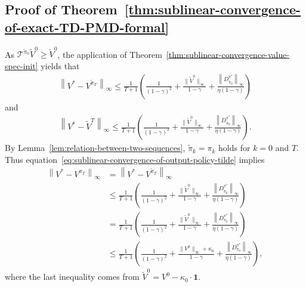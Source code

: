 \documentclass[10pt]{article}
\newcommand{\calT}{\mathcal{T}}
\newcommand{\ls}{\left}
\newcommand{\rs}{\right}
\theoremstyle{plain}
\theoremstyle{definition}
\begin{document}
\subsection{Proof of Theorem~\ref{thm:sublinear-convergence-of-exact-TD-PMD-formal}}
\label{sec:pf:thm:sublinear-convergence-of-exact-TD-PMD-formal}
As $\calT^{\tilde{\pi}_0} \tilde{V}^0 \geq \tilde{V}^0$, the application of Theorem~\ref{thm:sublinear-convergence-value-spec-init} yields that
\begin{align}
    \ls\| V^* - V^{\tilde{\pi}_T} \rs\|_\infty \leq \frac{1}{T+1} \ls( \frac{1}{(1-\gamma)^2} \!+\! \frac{\| \tilde{V}^0 \|_\infty}{1-\gamma} \!+\! \frac{\ls\| D^{\pi^*}_{\tilde{\pi}_0} \rs\|_\infty}{\eta(1-\gamma)} \rs)
    \label{eq:sublinear-convergence-of-output-policy-tilde}
\end{align}
and 
\begin{align}
    \ls\| V^* - \tilde{V}^T \rs\|_\infty \leq \frac{1}{T+1} \ls( \frac{1}{(1-\gamma)^2} \!+\! \frac{\| \tilde{V}^0 \|_\infty}{1-\gamma} \!+\! \frac{\ls\| D^{\pi^*}_{\tilde{\pi}_0} \rs\|_\infty}{\eta(1-\gamma)} \rs).
    \label{eq:sublinear-convergence-of-output-value-tilde}
\end{align}
By Lemma~\ref{lem:relation-between-two-sequences}, $\tilde{\pi}_k = \pi_k$ holds for $k=0$ and $T$. Thus equation~\eqref{eq:sublinear-convergence-of-output-policy-tilde} implies
\begin{align*}
    \ls\| V^* - V^{\pi_T} \rs\|_\infty &=  \ls\| V^* - V^{\tilde{\pi}_T} \rs\|_\infty \\
    &\leq \frac{1}{T+1} \ls( \frac{1}{(1-\gamma)^2} \!+\! \frac{\| \tilde{V}^0 \|_\infty}{1-\gamma} \!+\! \frac{\ls\| D^{\pi^*}_{\tilde{\pi}_0} \rs\|_\infty}{\eta(1-\gamma)} \rs) \\
    &= \frac{1}{T+1} \ls( \frac{1}{(1-\gamma)^2} \!+\! \frac{\| \tilde{V}^0 \|_\infty}{1-\gamma} \!+\! \frac{\ls\| D^{\pi^*}_{{\pi}_0} \rs\|_\infty}{\eta(1-\gamma)} \rs) \\
    &\leq \frac{1}{T+1} \ls( \frac{1}{(1-\gamma)^2} \!+\! \frac{\| {V}^0 \|_\infty + \kappa_0}{1-\gamma} \!+\! \frac{\ls\| D^{\pi^*}_{{\pi}_0} \rs\|_\infty}{\eta(1-\gamma)} \rs),
\end{align*}
where the last inequality comes from $\tilde{V}^0 = V^0 - \kappa_0 \cdot \mathbf{1}$. 
\end{document}
